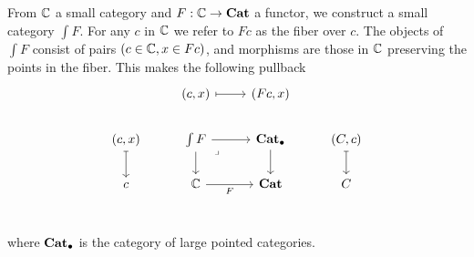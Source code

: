 \begin{defn}
  From $\mathbb{C}$ a small category and $F : \mathbb{C} \to \mathbf{Cat}$
  a functor, we construct a small category $\int F$.
  For any $c$ in $\mathbb{C}$ we refer to $F c$ as the fiber over $c$.
  The objects of $\int F$ consist of pairs $(c \in \mathbb{C}, x \in F c)$,
  and morphisms are those in $\mathbb{C}$ preserving the points in the fiber.
  This makes the following pullback
  \[\begin{tikzcd}
    & {(c,x)} & {(Fc, x)} \\
    {(c,x)} & {\int F} & \ptCat & {(C,c)} \\
    c & \catC & \Cat & C \\
    & {}
    \arrow[maps to, from=1-2, to=1-3]
    \arrow[maps to, from=2-1, to=3-1]
    \arrow[from=2-2, to=2-3]
    \arrow[from=2-2, to=3-2]
    \arrow["\lrcorner"{anchor=center, pos=0.125}, draw=none, from=2-2, to=3-3]
    \arrow[from=2-3, to=3-3]
    \arrow[maps to, from=2-4, to=3-4]
    \arrow["F"', from=3-2, to=3-3]
  \end{tikzcd}\]
  where $\mathbf{Cat}_\bullet$ is the category of large pointed categories.
\end{defn}

\medskip

